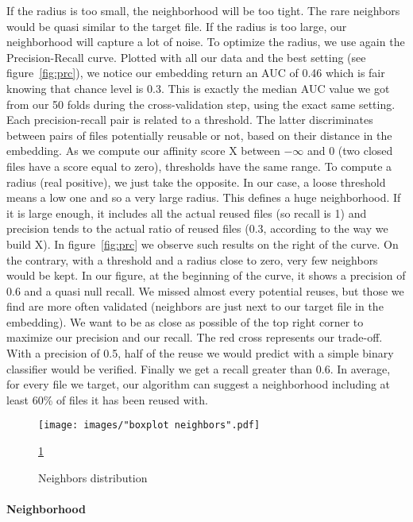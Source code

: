 \documentclass[a4paper]{article}
\begin{document}
	If the radius is too small, the neighborhood will be too tight. The rare neighbors would be quasi similar to the target file. If the radius is too large, our neighborhood will capture a lot of noise. To optimize the radius, we use again the Precision-Recall curve. Plotted with all our data and the best setting (see figure~\ref{fig:prc}), we notice our embedding return an \ac{AUC} of 0.46 which is fair knowing that chance level is 0.3. This is exactly the median \ac{AUC} value we got from our 50 folds during the cross-validation step, using the exact same setting. Each precision-recall pair is related to a threshold. The latter discriminates between pairs of files potentially reusable or not, based on their distance in the embedding. As we compute our affinity score X between $-\infty$ and 0 (two closed files have a score equal to zero), thresholds have the same range. To compute a radius (real positive), we just take the opposite. In our case, a loose threshold means a low one and so a very large radius. This defines a huge neighborhood. If it is large enough, it includes all the actual reused files (so recall is 1) and precision tends to the actual ratio of reused files (0.3, according to the way we build X). In figure~\ref{fig:prc} we observe such results on the right of the curve. On the contrary, with a threshold and a radius close to zero, very few neighbors would be kept. In our figure, at the beginning of the curve, it shows a precision of 0.6 and a quasi null recall. We missed almost every potential reuses, but those we find are more often validated (neighbors are just next to our target file in the embedding). We want to be as close as possible of the top right corner to maximize our precision and our recall. The red cross represents our trade-off. With a precision of 0.5, half of the reuse we would predict with a simple binary classifier would be verified. Finally we get a recall greater than 0.6. In average, for every file we target, our algorithm can suggest a neighborhood including at least 60\% of files it has been reused with.
	
	\begin{figure}[]
		\texttt{[image: images/"boxplot neighbors".pdf]}
		\caption{Neighbors distribution}
		\label{fig:neighbors}
		\ref{fig:neighbors}
	\end{figure}

	\paragraph{Neighborhood}
	
\end{document}
